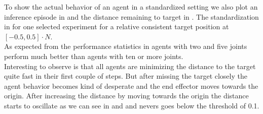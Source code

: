 To show the actual behavior of an agent in a standardized setting we also plot an inference episode in  and the distance remaining to target in . The standardization in  for one selected experiment for a relative consistent target position at $[-0.5, 0.5] \cdot N$. \\
As expected from the performance statistics in  agents with two and five joints perform much better than agents with ten or more joints. \\
Interesting to observe is that all agents are minimizing the distance to the target quite fast in their first couple of steps. But after missing the target closely the agent behavior becomes kind of desperate and the end effector moves towards the origin. After increasing the distance by moving towards the origin the distance starts to oscillate as we can see in  and  and nevers goes below the threshold of 0.1.
